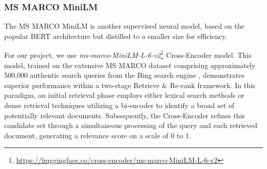 \subsubsection{MS MARCO MiniLM}
The MS MARCO MiniLM is another supervised neural model, based on the popular BERT architecture but distilled to a smaller size for efficiency.
\begin{table}[ht!]
    \centering
    \noindent
    \caption{Performance of Pre-trained Cross-Encoders}
    \label{tab:table2}
\end{table}
For our project, we use \textit{ms-marco-MiniLM-L-6-v2}\footnote{\url{https://huggingface.co/cross-encoder/ms-marco-MiniLM-L-6-v2}} Cross-Encoder model.
This model, trained on the extensive MS MARCO dataset comprising approximately 500,000 authentic search queries from the Bing search engine \cite{reimers-2019-sentence-bert}, demonstrates superior performance within a two-stage Retrieve \& Re-rank framework.
In this paradigm, an initial retrieval phase employs either lexical search methods or dense retrieval techniques utilizing a bi-encoder to identify a broad set of potentially relevant documents.
Subsequently, the Cross-Encoder refines this candidate set through a simultaneous processing of the query and each retrieved document, generating a relevance score on a scale of 0 to 1.

